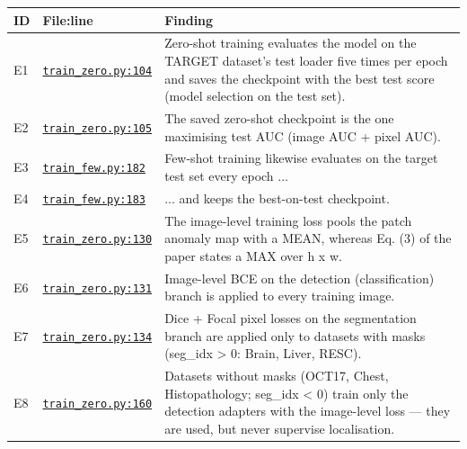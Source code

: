 \documentclass[11pt,a4paper]{article}
\begin{document}
{\small\begin{longtable}{@{}l P{3.6cm} P{10.8cm}@{}}\toprule ID & File:line & Finding\\\midrule\endhead
E1 & \href{https://github.com/MediaBrain-SJTU/MVFA-AD/blob/a30bf7bb2c51772a36e7be58d3c072be480620fe/train_zero.py#L104}{\texttt{train\_\allowbreak{}zero.py:104}} & Zero-shot training evaluates the model on the TARGET dataset's test loader five times per epoch and saves the checkpoint with the best test score (model selection on the test set).\\
E2 & \href{https://github.com/MediaBrain-SJTU/MVFA-AD/blob/a30bf7bb2c51772a36e7be58d3c072be480620fe/train_zero.py#L105}{\texttt{train\_\allowbreak{}zero.py:105}} & The saved zero-shot checkpoint is the one maximising test AUC (image AUC + pixel AUC).\\
E3 & \href{https://github.com/MediaBrain-SJTU/MVFA-AD/blob/a30bf7bb2c51772a36e7be58d3c072be480620fe/train_few.py#L182}{\texttt{train\_\allowbreak{}few.py:182}} & Few-shot training likewise evaluates on the target test set every epoch ...\\
E4 & \href{https://github.com/MediaBrain-SJTU/MVFA-AD/blob/a30bf7bb2c51772a36e7be58d3c072be480620fe/train_few.py#L183}{\texttt{train\_\allowbreak{}few.py:183}} & ... and keeps the best-on-test checkpoint.\\
E5 & \href{https://github.com/MediaBrain-SJTU/MVFA-AD/blob/a30bf7bb2c51772a36e7be58d3c072be480620fe/train_zero.py#L130}{\texttt{train\_\allowbreak{}zero.py:130}} & The image-level training loss pools the patch anomaly map with a MEAN, whereas Eq. (3) of the paper states a MAX over h x w.\\
E6 & \href{https://github.com/MediaBrain-SJTU/MVFA-AD/blob/a30bf7bb2c51772a36e7be58d3c072be480620fe/train_zero.py#L131}{\texttt{train\_\allowbreak{}zero.py:131}} & Image-level BCE on the detection (classification) branch is applied to every training image.\\
E7 & \href{https://github.com/MediaBrain-SJTU/MVFA-AD/blob/a30bf7bb2c51772a36e7be58d3c072be480620fe/train_zero.py#L134}{\texttt{train\_\allowbreak{}zero.py:134}} & Dice + Focal pixel losses on the segmentation branch are applied only to datasets with masks (seg\_\allowbreak{}idx \textgreater{} 0: Brain, Liver, RESC).\\
E8 & \href{https://github.com/MediaBrain-SJTU/MVFA-AD/blob/a30bf7bb2c51772a36e7be58d3c072be480620fe/train_zero.py#L160}{\texttt{train\_\allowbreak{}zero.py:160}} & Datasets without masks (OCT17, Chest, Histopathology; seg\_\allowbreak{}idx \textless{} 0) train only the detection adapters with the image-level loss — they are used, but never supervise localisation.\\

\end{longtable}}
\end{document}

